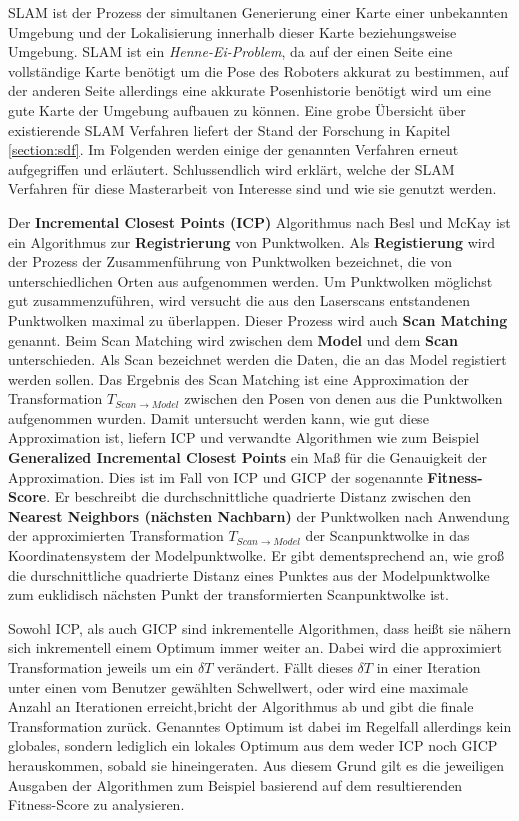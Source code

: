 SLAM ist der Prozess der simultanen Generierung einer Karte einer unbekannten Umgebung und der Lokalisierung innerhalb dieser Karte beziehungsweise Umgebung.
SLAM ist ein \textit{Henne-Ei-Problem}, da auf der einen Seite eine vollständige Karte benötigt um die Pose des Roboters akkurat zu bestimmen, auf der anderen Seite allerdings eine akkurate Posenhistorie benötigt wird um eine gute Karte der Umgebung aufbauen zu können.
Eine grobe Übersicht über existierende SLAM Verfahren liefert der Stand der Forschung in Kapitel \ref{section:sdf}.
Im Folgenden werden einige der genannten Verfahren erneut aufgegriffen und erläutert.
Schlussendlich wird erklärt, welche der SLAM Verfahren für diese Masterarbeit von Interesse sind und wie sie genutzt werden.

Der \textbf{Incremental Closest Points (ICP)} Algorithmus nach Besl und McKay \cite{Besl:1992} ist ein Algorithmus zur \textbf{Registrierung} von Punktwolken.
Als \textbf{Registierung} wird der Prozess der Zusammenführung von Punktwolken bezeichnet, die von unterschiedlichen Orten aus aufgenommen werden. Um Punktwolken möglichst gut zusammenzuführen, wird versucht die aus den Laserscans entstandenen Punktwolken maximal zu überlappen. Dieser Prozess wird auch \textbf{Scan Matching} genannt.
Beim Scan Matching wird zwischen dem \textbf{Model} und dem \textbf{Scan} unterschieden.
Als Scan bezeichnet werden die Daten, die an das Model registiert werden sollen.
Das Ergebnis des Scan Matching ist eine Approximation der Transformation $T_{Scan \rightarrow Model}$ zwischen den Posen von denen aus die Punktwolken aufgenommen wurden.
Damit untersucht werden kann, wie gut diese Approximation ist, liefern ICP und verwandte Algorithmen wie zum Beispiel \textbf{Generalized Incremental Closest Points} \cite{segal2009generalized} ein Maß für die Genauigkeit der Approximation. Dies ist im Fall von ICP und GICP der sogenannte \textbf{Fitness-Score}. Er beschreibt die durchschnittliche quadrierte Distanz zwischen den \textbf{Nearest Neighbors (nächsten Nachbarn)} der Punktwolken nach Anwendung der approximierten Transformation $T_{Scan \rightarrow Model}$ der Scanpunktwolke in das Koordinatensystem der Modelpunktwolke.
Er gibt dementsprechend an, wie groß die durschnittliche quadrierte Distanz eines Punktes aus der Modelpunktwolke zum euklidisch nächsten Punkt der transformierten Scanpunktwolke ist.

Sowohl ICP, als auch GICP sind inkrementelle Algorithmen, dass heißt sie nähern sich inkrementell einem Optimum immer weiter an. Dabei wird die approximiert Transformation jeweils um ein $\delta T$ verändert. Fällt dieses $\delta T$ in einer Iteration unter einen vom Benutzer gewählten Schwellwert, oder wird eine maximale Anzahl an Iterationen erreicht,bricht der Algorithmus ab und gibt die finale Transformation zurück.
Genanntes Optimum ist dabei im Regelfall allerdings kein globales, sondern lediglich ein lokales Optimum aus dem weder ICP noch GICP herauskommen, sobald sie hineingeraten.
Aus diesem Grund gilt es die jeweiligen Ausgaben der Algorithmen zum Beispiel basierend auf dem resultierenden Fitness-Score zu analysieren. 

